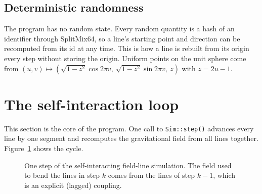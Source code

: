 \documentclass[12pt]{article}
\newcommand{\vect}[1]{\mathbf{#1}}
\begin{document}
\subsection{Deterministic randomness}

The program has no random state. Every random quantity is a hash of an identifier
through SplitMix64, so a line's starting point and direction can be
recomputed from its id at any time. This is how a line is rebuilt from its
origin every step without storing the origin. Uniform points on the unit
sphere come from $(u,v)\mapsto(\sqrt{1-z^2}\cos 2\pi v,\ \sqrt{1-z^2}\sin 2\pi v,\ z)$
with $z = 2u-1$.

\section{The self-interaction loop}
\label{sec:loop}

This section is the core of the program. One call to \texttt{Sim::step()}
advances every line by one segment and recomputes the gravitational field
from all lines together. Figure~\ref{fig:cycle} shows the cycle.

\begin{figure}[htb]
\centering
{}
\caption{One step of the self-interacting field-line simulation. The field
used to bend the lines in step $k$ comes from the lines of step $k-1$, which is an
explicit (lagged) coupling.}
\label{fig:cycle}
\end{figure}
\end{document}
